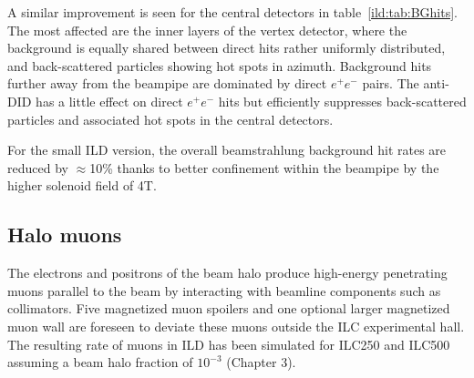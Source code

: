 A similar improvement is seen for the central detectors in table~\ref{ild:tab:BGhits}. The most affected are the inner layers of the vertex detector, where the background is equally shared between direct hits rather uniformly distributed, and back-scattered particles showing hot spots in azimuth. Background hits further away from the beampipe are dominated by direct $e^+e^-$ pairs. The anti-DID has a little effect on direct $e^+e^-$ hits but efficiently suppresses back-scattered particles and associated hot spots in the central detectors.

For the small ILD version, the overall beamstrahlung background hit rates are reduced by $\approx$10\%  thanks to better confinement within the beampipe by the higher solenoid field of 4T.



\subsection{Halo muons}

The electrons and positrons of the beam halo produce high-energy penetrating muons parallel to the beam by interacting with beamline components such as collimators. Five magnetized muon spoilers and one optional larger magnetized muon wall are foreseen to deviate these muons outside the ILC experimental hall. The resulting rate of muons in ILD has been simulated for ILC250 and ILC500 assuming a beam halo fraction of $10^{-3}$ (Chapter 3). 


